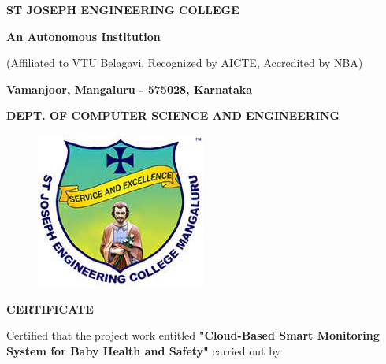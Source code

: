 \documentclass[12pt,a4paper]{report}
\begin{document}
\begin{center}
\LARGE \textbf{ST JOSEPH ENGINEERING COLLEGE}
\par
\Large \textbf{An Autonomous Institution}
\par \large{(Affiliated to VTU Belagavi, Recognized by AICTE, Accredited by NBA)}
\par \vspace{3pt}
\large \textbf{Vamanjoor, Mangaluru - 575028, Karnataka}
\par \vspace{12pt}  
\par
\large \textbf{DEPT. OF COMPUTER SCIENCE AND ENGINEERING}
\par
\begin{figure}[hbtp]
\centering
\includegraphics[scale=0.5]{./pic/sjeclogo}
\end{figure}


{\Large \textbf{CERTIFICATE}}
\end{center}
\justifying
\par
{}
\noindent 
Certified that the project work entitled \textbf{"Cloud-Based Smart Monitoring System
for Baby Health and Safety"} carried out by\vspace{0.25in} 
\par
\end{document}
